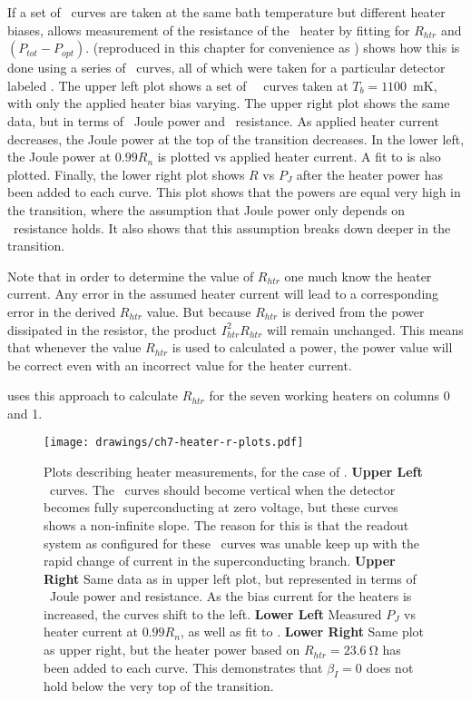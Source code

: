 If a set of \IV\ curves are taken at the same bath temperature but different heater biases,  allows measurement of the resistance of the \TES\ heater by fitting for $R_{htr}$ and $(P_{tot} - P_{opt})$.
 (reproduced in this chapter for convenience as ) shows how this is done using a series of \IV\ curves, all of which were taken for a particular detector labeled .
The upper left plot shows a set of \TES\ \IV\ curves taken at $T_b = 1100$~mK, with only the applied heater bias varying.
The upper right plot shows the same data, but in terms of \TES\ Joule power and \TES\ resistance.
As applied heater current decreases, the Joule power at the top of the transition decreases.
In the lower left, the Joule power at $0.99R_{n}$ is plotted vs applied heater current.
A fit to  is also plotted.
Finally, the lower right plot shows $R$ vs $P_J$ after the heater power has been added to each curve.
This plot shows that the powers are equal very high in the transition, where the assumption that Joule power only depends on \TES\ resistance holds.
It also shows that this assumption breaks down deeper in the transition.

Note that in order to determine the value of $R_{htr}$ one much know the heater current.
Any error in the assumed heater current will lead to a corresponding error in the derived $R_{htr}$ value.
But because $R_{htr}$ is derived from the power dissipated in the resistor, the product $I_{htr}^2 R_{htr}$ will remain unchanged.
This means that whenever the value $R_{htr}$ is used to calculated a power, the power value will be correct even with an incorrect value for the heater current.

 uses this approach to calculate $R_{htr}$ for the seven working heaters on columns 0 and 1.

\begin{figure*}
\texttt{[image: drawings/ch7-heater-r-plots.pdf]}
\caption[Plots describing heater measurements]{
Plots describing heater measurements, for the case of .
\textbf{Upper Left} \IV\ curves. The \IV\ curves should become vertical when the detector becomes fully superconducting at zero voltage, but these curves shows a non-infinite slope. The reason for this is that the readout system as configured for these \IV\ curves was unable keep up with the rapid change of current in the superconducting branch.
\textbf{Upper Right} Same data as in upper left plot, but represented in terms of \TES\ Joule power and resistance. As the bias current for the heaters is increased, the curves shift to the left.
\textbf{Lower Left} Measured $P_{J}$ vs heater current at $0.99R_n$, as well as fit to .
\textbf{Lower Right} Same plot as upper right, but the heater power based on $R_{htr} = \SI{23.6}{\ohm}$ has been added to each curve.
This demonstrates that $\beta_I = 0$ does not hold below the very top of the transition.}
\label{fig:ch3-heater-r-plots}
\end{figure*}

